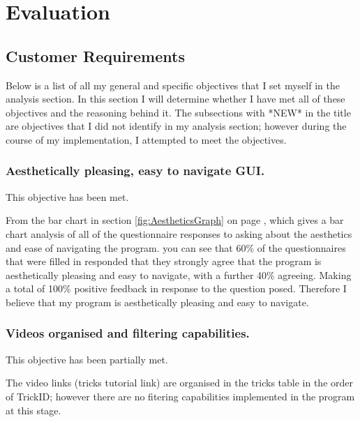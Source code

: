 \chapter{Evaluation}

\section{Customer Requirements}

Below is a list of all my general and specific objectives that I set myself in the analysis section. In this section I will determine whether I have met all of these objectives and the reasoning behind it. The subsections with *NEW* in the title are objectives that I did not identify in my analysis section; however during the course of my implementation, I attempted to meet the objectives. 

\subsection{Aesthetically pleasing, easy to navigate GUI.} %

This objective has been met.

From the bar chart in section \ref{fig:AestheticsGraph} on page \pageref{fig:AestheticsGraph}, which gives a bar chart analysis of all of the questionnaire responses to asking about the aesthetics and ease of navigating the program. you can see that 60\% of the questionnaires that were filled in responded that they strongly agree that the program is aesthetically pleasing and easy to navigate, with a further 40\% agreeing. Making a total of 100\% positive feedback in response to the question posed. Therefore I believe that my program is aesthetically pleasing and easy to navigate.




\subsection{Videos organised and filtering capabilities.}

This objective has been partially met. 

The video links (tricks tutorial link) are organised in the tricks table in the order of TrickID; however there are no fitering capabilities implemented in the program at this stage. 


